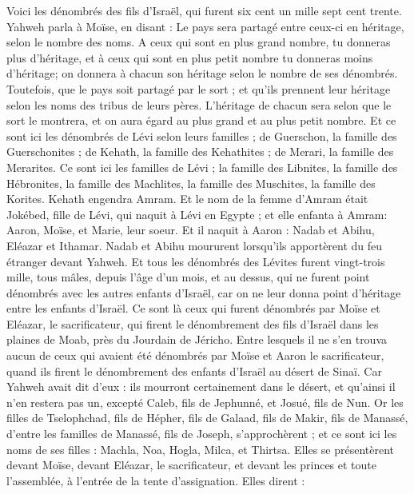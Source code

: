 \begin{multicols}{2}
Voici les dénombrés des fils d'Israël, qui furent six cent un mille sept cent trente.
Yahweh parla à Moïse, en disant :
Le pays sera partagé entre ceux-ci en héritage, selon le nombre des noms.
A ceux qui sont en plus grand nombre, tu donneras plus d'héritage, et à ceux qui sont en plus petit nombre tu donneras moins d'héritage; on donnera à chacun son héritage selon le nombre de ses dénombrés.
Toutefois, que le pays soit partagé par le sort ; et qu’ils prennent leur héritage selon les noms des tribus de leurs pères.
L’héritage de chacun sera selon que le sort le montrera, et on aura égard au plus grand et au plus petit nombre.
Et ce sont ici les dénombrés de Lévi selon leurs familles ; de Guerschon, la famille des Guerschonites ; de Kehath, la famille des Kehathites ; de Merari, la famille des Merarites.
Ce sont ici les familles de Lévi ; la famille des Libnites, la famille des Hébronites, la famille des Machlites, la famille des Muschites, la famille des Korites. Kehath engendra Amram.
Et le nom de la femme d'Amram était Jokébed, fille de Lévi, qui naquit à Lévi en Egypte ; et elle enfanta à Amram: Aaron, Moïse, et Marie, leur soeur.
Et il naquit à Aaron : Nadab et Abihu, Eléazar et Ithamar.
Nadab et Abihu moururent lorsqu'ils apportèrent du feu étranger devant Yahweh.
Et tous les dénombrés des Lévites furent vingt-trois mille, tous mâles, depuis l’âge d’un mois, et au dessus, qui ne furent point dénombrés avec les autres enfants d’Israël, car on ne leur donna point d’héritage entre les enfants d’Israël.
Ce sont là ceux qui furent dénombrés par Moïse et Eléazar, le sacrificateur, qui firent le dénombrement des fils d'Israël dans les plaines de Moab, près du Jourdain de Jéricho.
Entre lesquels il ne s’en trouva aucun de ceux qui avaient été dénombrés par Moïse et Aaron le sacrificateur, quand ils firent le dénombrement des enfants d’Israël au désert de Sinaï.
Car Yahweh avait dit d'eux : ils mourront certainement dans le désert, et qu'ainsi il n'en restera pas un, excepté Caleb, fils de Jephunné, et Josué, fils de Nun.
\VerseOne{}Or les filles de Tselophchad, fils de Hépher, fils de Galaad, fils de Makir, fils de Manassé, d'entre les familles de Manassé, fils de Joseph, s'approchèrent ;  et ce sont ici les noms de ses filles : Machla, Noa, Hogla, Milca, et Thirtsa.
Elles se présentèrent devant Moïse, devant Eléazar, le sacrificateur, et devant les princes et toute l'assemblée, à l'entrée de la tente d'assignation. Elles dirent :

\end{multicols}
